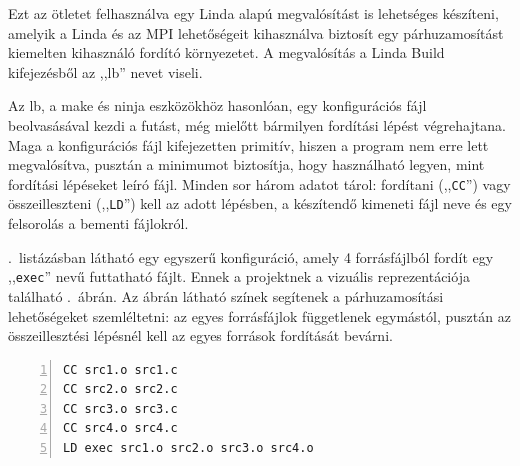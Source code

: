 Ezt az ötletet felhasználva egy Linda alapú megvalósítást is lehetséges készíteni, amelyik a Linda és az MPI lehetőségeit kihasználva biztosít egy párhuzamosítást 
kiemelten kihasználó fordító környezetet.
A megvalósítás a Linda Build kifejezésből az ,,lb'' nevet viseli.

Az lb, a make és ninja eszközökhöz hasonlóan, egy konfigurációs fájl beolvasásával kezdi a futást, még mielőtt bármilyen fordítási lépést végrehajtana.
Maga a konfigurációs fájl kifejezetten primitív, hiszen a program nem erre lett megvalósítva, pusztán a minimumot biztosítja, hogy használható legyen, mint fordítási lépéseket leíró fájl.
Minden sor három adatot tárol: fordítani (,,\texttt{CC}'') vagy összeilleszteni (,,\texttt{LD}'') kell az adott lépésben, a készítendő kimeneti fájl neve és egy felsorolás a bementi fájlokról.

.~listázásban látható egy egyszerű konfiguráció, amely 4 forrásfájlból fordít egy ,,\texttt{exec}'' nevű futtatható fájlt.
Ennek a projektnek a vizuális reprezentációja található .~ábrán.
Az ábrán látható színek segítenek a párhuzamosítási lehetőségeket szemléltetni: az egyes forrásfájlok függetlenek egymástól, pusztán az összeillesztési lépésnél kell az egyes források fordítását bevárni.

\begin{lstlisting}[numbers=left, label=lst:lb-conf, caption={Példa lb konfiguráció}]
CC src1.o src1.c
CC src2.o src2.c
CC src3.o src3.c
CC src4.o src4.c
LD exec src1.o src2.o src3.o src4.o
\end{lstlisting}

